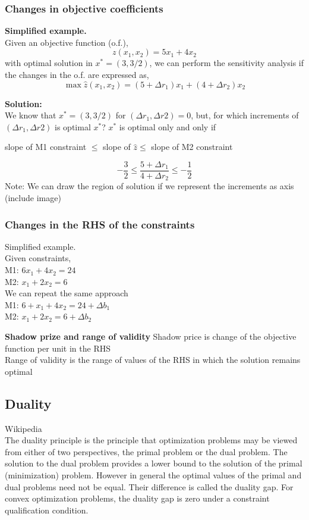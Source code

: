 \subsubsection{Changes in objective coefficients}
\textbf{Simplified example.}\\
Given an objective function (o.f.),
\[ z(x_1, x_2) = 5x_1 + 4x_2 \]
with optimal solution in $x^* = (3, 3/2)$, we can perform the sensitivity analysis if the changes in the o.f. are expressed as,
\[ \max \hat{z}(x_1, x_2) = (5+\Delta r_1)x_1 + (4 + \Delta r_2)x_2 \]

\textbf{Solution:}\\
We know that $x^* = (3, 3/2)$ for $(\Delta r_1, \Delta r2) = 0$, but, for which increments of $(\Delta r_1, \Delta r2)$ is optimal $x^*$?
$x^*$ is optimal only and only if
\begin{center}
    slope of M1 constraint $\leq$ slope of $\hat{z} \leq$ slope of M2 constraint
\end{center} 
\[ -\frac{3}{2} \leq \frac{5 + \Delta r_1}{4 + \Delta r_2} \leq -\frac{1}{2} \]
Note: We can draw the region of solution if we represent the increments as axis (include image)

\subsubsection{Changes in the RHS of the constraints}
Simplified example.\\
Given constraints,\\
M1: $ 6x_1 + 4x_2 = 24 $ \\
M2: $ x_1 + 2x_2 = 6 $\\
We can repeat the same approach\\
M1: $ 6+x_1 + 4x_2 = 24 + \Delta b_1 $\\
M2: $ x_1 + 2x_2 = 6 + \Delta b_2 $

\textbf{Shadow prize and range of validity}
Shadow price is change of the objective function per unit in the RHS\\
Range of validity is the range of values of the RHS in which the solution remains optimal

\subsection{Duality}
Wikipedia\\
The duality principle is the principle that optimization problems may be viewed from either of two perspectives, the primal problem or the dual problem. 
The solution to the dual problem provides a lower bound to the solution of the primal (minimization) problem. However in general the optimal values of 
the primal and dual problems need not be equal. Their difference is called the duality gap. For convex optimization problems, the duality gap is zero under 
a constraint qualification condition. \\

